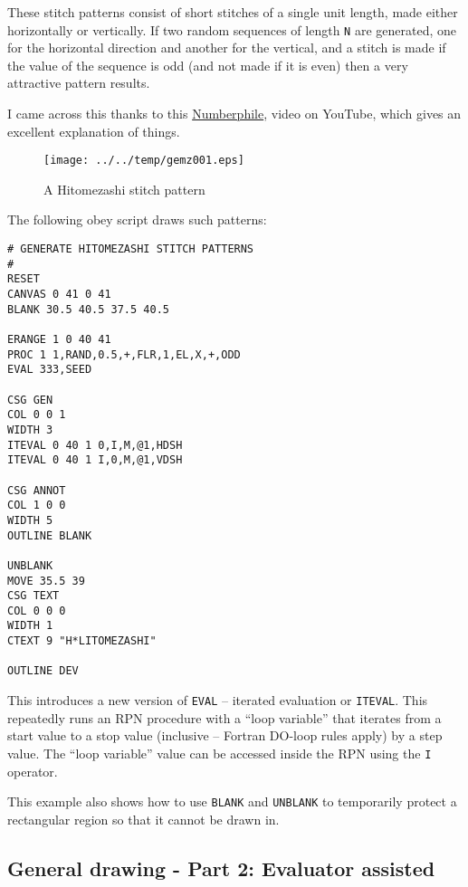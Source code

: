 \documentclass[a4paper,twoside,11pt]{article}
\makeatletter
\def\maxwidth{%
  \ifdim\Gin@nat@width>\linewidth
    \linewidth
  \else
    \Gin@nat@width
  \fi
}
\newcommand{\newpara}{\par\vspace{4mm}\noindent}
\makeatother
\begin{document}
\newpara
These stitch patterns consist of short stitches of a single unit length,
made either horizontally or vertically. If two random sequences of
length \texttt{N} are generated, one for the horizontal direction and
another for the vertical, and a stitch is made if the value of the
sequence is odd (and not made if it is even) then a very attractive
pattern results.

\newpara
I came across this thanks to this
\href{https://www.youtube.com/watch?v=JbfhzlMk2eY}{Numberphile}, video
on YouTube, which gives an excellent explanation of things.

\begin{figure}
  \centering
  \texttt{[image: ../../temp/gemz001.eps]}
  \caption{A Hitomezashi stitch pattern}
  \label{fig:gemz001}
\end{figure}

\newpara
The following obey script draws such patterns:

\begin{lstlisting}
# GENERATE HITOMEZASHI STITCH PATTERNS
#
RESET
CANVAS 0 41 0 41
BLANK 30.5 40.5 37.5 40.5

ERANGE 1 0 40 41
PROC 1 1,RAND,0.5,+,FLR,1,EL,X,+,ODD
EVAL 333,SEED

CSG GEN
COL 0 0 1
WIDTH 3
ITEVAL 0 40 1 0,I,M,@1,HDSH
ITEVAL 0 40 1 I,0,M,@1,VDSH

CSG ANNOT
COL 1 0 0
WIDTH 5
OUTLINE BLANK

UNBLANK
MOVE 35.5 39
CSG TEXT
COL 0 0 0
WIDTH 1
CTEXT 9 "H*LITOMEZASHI"

OUTLINE DEV
\end{lstlisting}

\newpara
This introduces a new version of \texttt{EVAL} -- iterated evaluation or
\texttt{ITEVAL}. This repeatedly runs an RPN procedure with a ``loop
variable'' that iterates from a start value to a stop value (inclusive --
Fortran DO-loop rules apply) by a step value. The ``loop variable''
value can be accessed inside the RPN using the \texttt{I} operator.

\newpara
This example also shows how to use \texttt{BLANK} and \texttt{UNBLANK}
to temporarily protect a rectangular region so that it cannot be drawn
in.


\subsection{General drawing - Part 2: Evaluator assisted}\label{general-drawing---part-2-evaluator-assisted}
\end{document}
